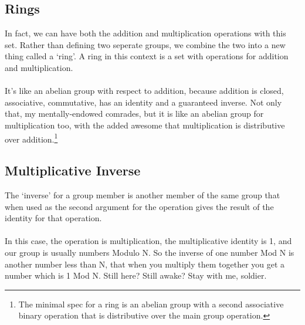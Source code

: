     \subsection{Rings}
    In fact, we can have both the addition and multiplication operations with this set. Rather than defining two seperate groups, we combine the two into a new thing called a `ring'.
    A ring in this context is a set with operations for addition and multiplication.\\
    \\
    It's like an abelian group with respect to addition, because addition is closed, associative, commutative, has an identity and a guaranteed inverse. Not only that, my mentally-endowed comrades, but it is like an abelian group for multiplication too, with the added awesome that multiplication is distributive over addition.\footnote{The minimal spec for a ring is an abelian group with a second associative binary operation that is distributive over the main group operation.}

    \subsection{Multiplicative Inverse}
    The `inverse' for a group member is another member of the same group that when used as the second argument for the operation gives the result of the identity for that operation.\\
    \\
    In this case, the operation is multiplication, the multiplicative identity is 1, and our group is usually numbers Modulo N. So the inverse of one number Mod N is another number less than N, that when you multiply them together you get a number which is 1 Mod N. Still here? Still awake? Stay with me, soldier.
    
